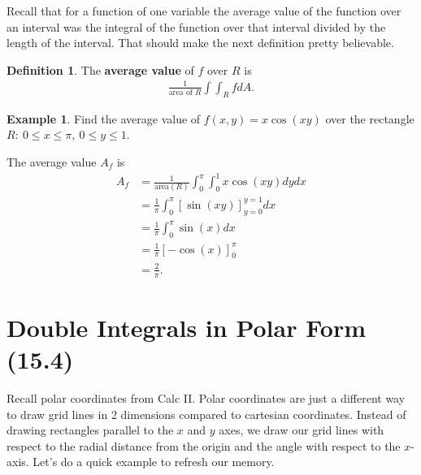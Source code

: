\documentclass[12pt, letter]{article}
\theoremstyle{plain}
\numberwithin{theorem}{section}
\theoremstyle{definition}
\newtheorem{definition}[theorem]{Definition}
\newtheorem{example}[theorem]{Example}
\begin{document}
\bigskip

\hrulefill

\bigskip

Recall that for a function of one variable the average value of the function over an interval was the integral of the function over that interval divided by the length of the interval. That should make the next definition pretty believable.

\begin{definition}
The \textbf{average value} of $f$ over $R$ is
\begin{align*}
\frac{1}{\text{area of } R} \int \int_R fdA.
\end{align*}
\end{definition}

\bigskip

\hrulefill

\bigskip

\begin{example}
Find the average value of $f(x,y) = x\cos(xy)$ over the rectangle $R: \ 0\leq x \leq \pi, \ 0\leq y \leq 1$.

\bigskip

The average value $A_f$ is
\begin{align*}
A_f&=\frac{1}{\text{area}(R)} \int_0^\pi \int_0^1 x\cos(xy) dydx\\
&= \frac{1}{\pi} \int_0^\pi \left[\sin(xy)\right]_{y=0}^{y=1} dx\\
&= \frac{1}{\pi} \int_0^\pi \sin(x)dx\\
&= \frac{1}{\pi} \left[-\cos(x)\right]_0^\pi\\
&= \frac{2}{\pi}.
\end{align*}
\end{example}

\newpage


\section{Double Integrals in Polar Form (15.4)}

Recall polar coordinates from Calc II. Polar coordinates are just a different way to draw grid lines in 2 dimensions compared to cartesian coordinates. Instead of drawing rectangles parallel to the $x$ and $y$ axes, we draw our grid lines with respect to the radial distance from the origin and the angle with respect to the $x$-axis. Let's do a quick example to refresh our memory.
\end{document}
